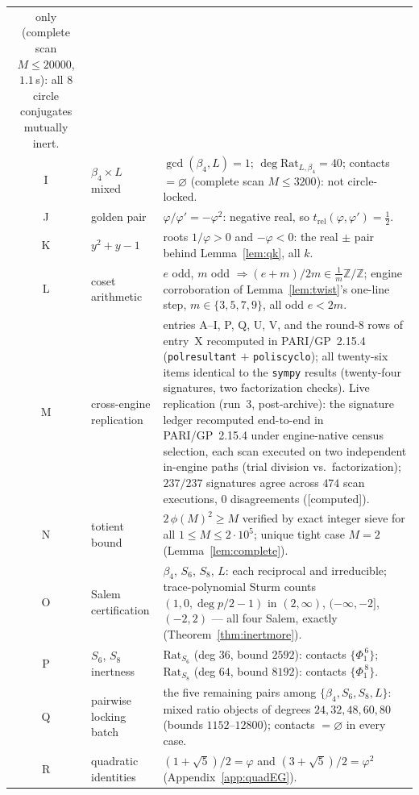 \documentclass[11pt]{article}
\theoremstyle{plain}
\theoremstyle{definition}
\theoremstyle{remark}
\newcommand{\Z}{\mathbb{Z}}
\newcommand{\Rat}{\mathrm{Rat}}
\newcommand{\C}{\textnormal{[computed]}}
\begin{document}
\begin{center}
\begin{tabular}{clp{9.2cm}}
only (complete scan $M\le20000$, $1.1$\,s): all $8$ circle conjugates mutually
inert.\\[2pt]
I & $\beta_4\times L$ mixed & $\gcd(\beta_4,L)=1$; $\deg\Rat_{L,\beta_4}=40$;
contacts $=\varnothing$ (complete scan $M\le3200$): not circle-locked.\\[2pt]
J & golden pair & $\varphi/\varphi'=-\varphi^2$: negative real, so
$t_{\mathrm{rel}}(\varphi,\varphi')=\tfrac12$.\\[2pt]
K & $y^2+y-1$ & roots $1/\varphi>0$ and $-\varphi<0$: the real $\pm$ pair
behind Lemma~\ref{lem:qk}, all $k$.\\[2pt]
L & coset arithmetic & $e$ odd, $m$ odd $\Rightarrow(e+m)/2m\in\frac1m\Z/\Z$;
engine corroboration of Lemma~\ref{lem:twist}'s one-line step,
$m\in\{3,5,7,9\}$, all odd $e<2m$.\\[2pt]
M & cross-engine replication & entries A--I, P, Q, U, V, and the round-8
rows of entry~X recomputed in PARI/GP~2.15.4 (\texttt{polresultant} $+$
\texttt{poliscyclo}); all twenty-six items identical to the \texttt{sympy}
results (twenty-four signatures, two factorization checks). Live replication
(run~3, post-archive): the signature ledger recomputed end-to-end in
PARI/GP~2.15.4 under engine-native census selection, each scan executed on
two independent in-engine paths (trial division vs.\ factorization);
$237/237$ signatures agree across $474$ scan executions, $0$ disagreements
(\C).\\[2pt]
N & totient bound & $2\,\phi(M)^2\ge M$ verified by exact integer sieve for
all $1\le M\le2\cdot10^{5}$; unique tight case $M=2$
(Lemma~\ref{lem:complete}).\\[2pt]
O & Salem certification & $\beta_4$, $S_6$, $S_8$, $L$: each reciprocal and
irreducible; trace-polynomial Sturm counts $(1,0,\deg p/2-1)$ in
$(2,\infty)$, $(-\infty,-2]$, $(-2,2)$ --- all four Salem, exactly
(Theorem~\ref{thm:inertmore}).\\[2pt]
P & $S_6$, $S_8$ inertness & $\Rat_{S_6}$ (deg $36$, bound $2592$): contacts
$\{\Phi_1^{\,6}\}$; $\Rat_{S_8}$ (deg $64$, bound $8192$): contacts
$\{\Phi_1^{\,8}\}$.\\[2pt]
Q & pairwise locking batch & the five remaining pairs among
$\{\beta_4,S_6,S_8,L\}$: mixed ratio objects of degrees $24,32,48,60,80$
(bounds $1152$--$12800$); contacts $=\varnothing$ in every case.\\[2pt]
R & quadratic identities & $(1+\sqrt5)/2=\varphi$ and
$(3+\sqrt5)/2=\varphi^2$ (Appendix~\ref{app:quadEG}).\\[2pt]

\end{tabular}
\end{center}
\end{document}
